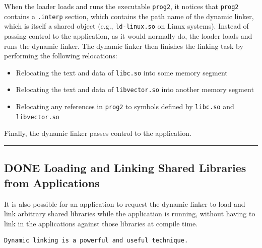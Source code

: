 \documentclass[11pt]{article}
\begin{document}
When the loader loads and runs the executable \texttt{prog2}, it notices that \texttt{prog2} contains a \texttt{.interp} section, which contains the path name of the dynamic linker, which is itself a shared object (e.g., \texttt{ld-linux.so} on Linux systems). Instead of passing control to the application, as it would normally do, the loader loads and runs the dynamic linker. The dynamic linker then finishes the linking task by performing the following relocations:\\
\begin{itemize}
\item Relocating the text and data of \texttt{libc.so} into some memory segment\\
\item Relocating the text and data of \texttt{libvector.so} into another memory segment\\
\item Relocating any references in \texttt{prog2} to symbols defined by \texttt{libc.so} and \texttt{libvector.so}\\
\end{itemize}

Finally, the dynamic linker passes control to the application.\\

\noindent\rule{\textwidth}{0.5pt}

\subsection{{\bfseries\sffamily DONE} Loading and Linking Shared Libraries from Applications}
\label{sec:org61f9d7d}
It is also possible for an application to request the dynamic linker to load and link arbitrary shared libraries while the application is running, without having to link in the applications against those libraries at compile time.\\

\begin{verbatim}
Dynamic linking is a powerful and useful technique. 
\end{verbatim}
\end{document}
